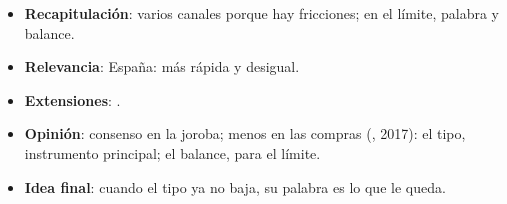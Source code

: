 \documentclass{article}
\begin{document}
\begin{columnas}
\begin{itemize}
\item \textbf{Recapitulación}: varios canales porque hay fricciones; en el límite, palabra y balance.
\item \textbf{Relevancia}: España: más rápida y desigual.
\item \textbf{Extensiones}:      .
\item \textbf{Opinión}: consenso en la joroba; menos en las compras (, 2017): el tipo, instrumento principal; el balance, para el límite.
\item \textbf{Idea final}: cuando el tipo ya no baja, su palabra es lo que le queda.
\end{itemize}


\end{columnas}
\end{document}

